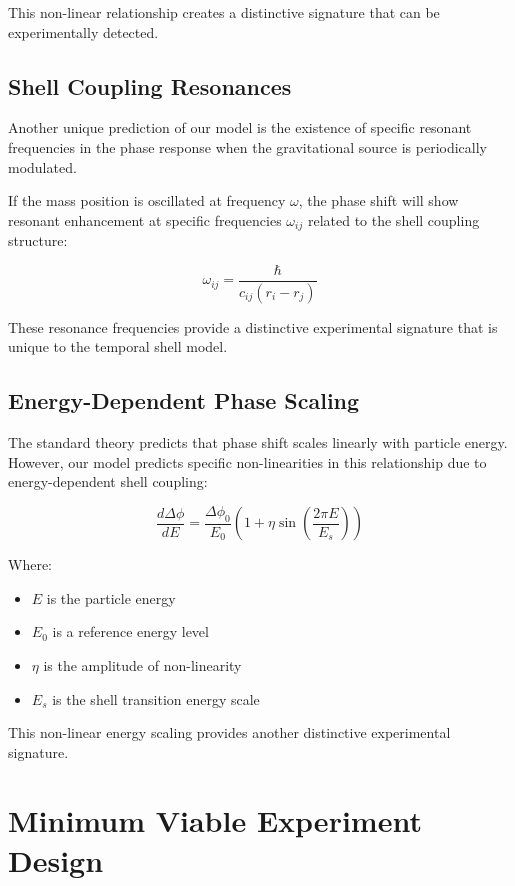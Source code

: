 \documentclass[12pt,a4paper]{article}
\begin{document}
This non-linear relationship creates a distinctive signature that can be experimentally detected.

\subsection{Shell Coupling Resonances}

Another unique prediction of our model is the existence of specific resonant frequencies in the phase response when the gravitational source is periodically modulated.

If the mass position is oscillated at frequency $\omega$, the phase shift will show resonant enhancement at specific frequencies $\omega_{ij}$ related to the shell coupling structure:

\begin{equation}
\omega_{ij} = \frac{\hbar}{c_{ij} (r_i - r_j)}
\end{equation}

These resonance frequencies provide a distinctive experimental signature that is unique to the temporal shell model.

\subsection{Energy-Dependent Phase Scaling}

The standard theory predicts that phase shift scales linearly with particle energy. However, our model predicts specific non-linearities in this relationship due to energy-dependent shell coupling:

\begin{equation}
\frac{d\Delta\phi}{dE} = \frac{\Delta\phi_0}{E_0} \left(1 + \eta \sin\left(\frac{2\pi E}{E_s}\right)\right)
\end{equation}

Where:
\begin{itemize}
    \item $E$ is the particle energy
    \item $E_0$ is a reference energy level
    \item $\eta$ is the amplitude of non-linearity
    \item $E_s$ is the shell transition energy scale
\end{itemize}

This non-linear energy scaling provides another distinctive experimental signature.

\section{Minimum Viable Experiment Design}
\end{document}
